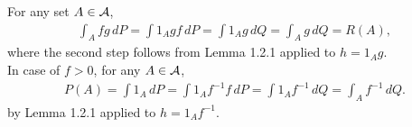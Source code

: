 \documentclass{report}
\begin{document}
\begin{myproof}
    For any set $A\in\mathcal A$,
    \begin{align*}
        \int_A fg\,dP=\int 1_Agf\,dP=\int 1_Ag\,dQ=\int_Ag\,dQ=R(A),
    \end{align*}where the second step follows from Lemma 1.2.1 applied to $h=1_Ag$.\\
    In case of $f>0$, for any $A\in\mathcal A$,
    \begin{align*}
        P(A)=\int1_A\,dP=\int 1_A f^{-1}f\,dP=\int 1_A f^{-1}\,dQ=\int_A f^{-1}\,dQ.
    \end{align*}by Lemma 1.2.1 applied to $h=1_Af^{-1}$.
\end{myproof}
\end{document}
